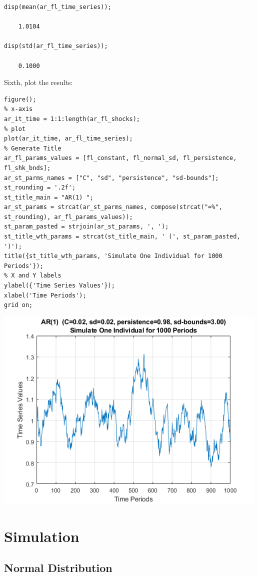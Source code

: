 \documentclass[
]{book}
\begin{document}
\begin{verbatim}
disp(mean(ar_fl_time_series));

    1.0104

disp(std(ar_fl_time_series));

    0.1000
\end{verbatim}

Sixth, plot the results:

\begin{verbatim}
figure();
% x-axis
ar_it_time = 1:1:length(ar_fl_shocks);
% plot
plot(ar_it_time, ar_fl_time_series);
% Generate Title
ar_fl_params_values = [fl_constant, fl_normal_sd, fl_persistence, fl_shk_bnds];
ar_st_parms_names = ["C", "sd", "persistence", "sd-bounds"];
st_rounding = '.2f';
st_title_main = "AR(1) ";
ar_st_params = strcat(ar_st_parms_names, compose(strcat("=%", st_rounding), ar_fl_params_values));
st_param_pasted = strjoin(ar_st_params, ', ');
st_title_wth_params = strcat(st_title_main, ' (', st_param_pasted, ')');
title({st_title_wth_params, 'Simulate One Individual for 1000 Periods'});
% X and Y labels
ylabel({'Time Series Values'});
xlabel('Time Periods');
grid on;
\end{verbatim}

\includegraphics[width=5.20833in,height=\textheight]{img/fs_autoregressive_images/figure_0.png}

\hypertarget{simulation}{%
\chapter{Simulation}\label{simulation}}

\hypertarget{normal-distribution}{%
\section{Normal Distribution}\label{normal-distribution}}
\end{document}
